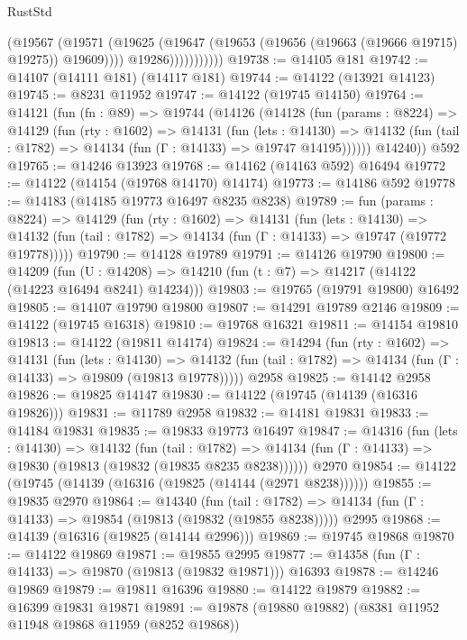 \begin{lexlean}{RustStd}
\begin{coremodule}
                        (@19567
                          (@19571
                            (@19625
                              (@19647 (@19653 (@19656 (@19663 (@19666 @19715) @19275)) @19609))))
                          @19286)))))))))))
@19738 := @14105 @181
@19742 := @14107 (@14111 @181) (@14117 @181)
@19744 := @14122 (@13921 @14123)
@19745 := @8231 @11952
@19747 := @14122 (@19745 @14150)
@19764 := @14121
    (fun (fn : @89) =>
    @19744
      (@14126
        (@14128
          (fun (params : @8224) =>
          @14129
            (fun (rty : @1602) =>
            @14131
              (fun (lets : @14130) =>
              @14132 (fun (tail : @1782) => @14134 (fun (Γ : @14133) => @19747 @14195))))))
        @14240))
    @592
@19765 := @14246 @13923
@19768 := @14162 (@14163 @592) @16494
@19772 := @14122 (@14154 (@19768 @14170) @14174)
@19773 := @14186 @592
@19778 := @14183 (@14185 @19773 @16497 @8235 @8238)
@19789 := fun (params : @8224) =>
  @14129
    (fun (rty : @1602) =>
    @14131
      (fun (lets : @14130) =>
      @14132 (fun (tail : @1782) => @14134 (fun (Γ : @14133) => @19747 (@19772 @19778)))))
@19790 := @14128 @19789
@19791 := @14126 @19790
@19800 := @14209
    (fun (U : @14208) => @14210 (fun (t : @7) => @14217 (@14122 (@14223 @16494 @8241) @14234)))
@19803 := @19765 (@19791 @19800) @16492
@19805 := @14107 @19790 @19800
@19807 := @14291 @19789 @2146
@19809 := @14122 (@19745 @16318)
@19810 := @19768 @16321
@19811 := @14154 @19810
@19813 := @14122 (@19811 @14174)
@19824 := @14294
    (fun (rty : @1602) =>
    @14131
      (fun (lets : @14130) =>
      @14132 (fun (tail : @1782) => @14134 (fun (Γ : @14133) => @19809 (@19813 @19778)))))
    @2958
@19825 := @14142 @2958
@19826 := @19825 @14147
@19830 := @14122 (@19745 (@14139 (@16316 @19826)))
@19831 := @11789 @2958
@19832 := @14181 @19831
@19833 := @14184 @19831
@19835 := @19833 @19773 @16497
@19847 := @14316
    (fun (lets : @14130) =>
    @14132
      (fun (tail : @1782) =>
      @14134 (fun (Γ : @14133) => @19830 (@19813 (@19832 (@19835 @8235 @8238))))))
    @2970
@19854 := @14122 (@19745 (@14139 (@16316 (@19825 (@14144 (@2971 @8238))))))
@19855 := @19835 @2970
@19864 := @14340
    (fun (tail : @1782) => @14134 (fun (Γ : @14133) => @19854 (@19813 (@19832 (@19855 @8238)))))
    @2995
@19868 := @14139 (@16316 (@19825 (@14144 @2996)))
@19869 := @19745 @19868
@19870 := @14122 @19869
@19871 := @19855 @2995
@19877 := @14358 (fun (Γ : @14133) => @19870 (@19813 (@19832 @19871))) @16393
@19878 := @14246 @19869
@19879 := @19811 @16396
@19880 := @14122 @19879
@19882 := @16399 @19831 @19871
@19891 := @19878 (@19880 @19882) (@8381 @11952 @11948 @19868 @11959 (@8252 @19868))

\end{coremodule}
\end{lexlean}
